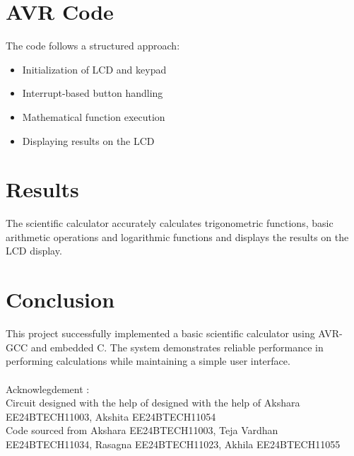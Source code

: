 \documentclass{article}
\begin{document}
 

\section{AVR Code}
 The code follows a structured approach:
\begin{itemize}
    \item Initialization of LCD and keypad
    \item Interrupt-based button handling
    \item Mathematical function execution
    \item Displaying results on the LCD
\end{itemize}


 
\section{Results}
The scientific calculator accurately calculates trigonometric functions, basic arithmetic operations and logarithmic functions and displays the results on the LCD display.

 
 
\section{Conclusion}
This project successfully implemented a basic scientific calculator using AVR-GCC and embedded C. The system demonstrates reliable performance in performing calculations while maintaining a simple user interface.\\\\
Acknowlegdement : \\Circuit designed with the help of designed with the help of Akshara EE24BTECH11003, Akshita EE24BTECH11054\\
Code sourced from Akshara EE24BTECH11003, Teja Vardhan EE24BTECH11034, Rasagna EE24BTECH11023, Akhila EE24BTECH11055
\end{document}
